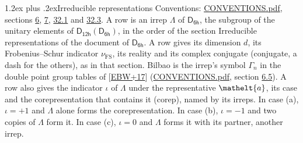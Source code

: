 \documentclass[10pt,a4paper]{article}
\makeatletter
\renewcommand\section{\@startsection{section}{1}{\z@}{-3ex plus -1ex minus -.2ex}%
  {1.2ex plus .2ex}{\normalfont\large\sffamily\bfseries\color{parttitle}}}
\numberwithin{equation}{section}
\newcommand{\eltfont}[1]{{\let\sigma\eltsigma\mathelt{#1}}}
\newcommand{\grp}[1]{\mathsf{#1}}
\newcommand{\elt}[1]{\eltfont{#1}}
\newcommand{\fsind}{\nu_{\mathrm{FS}}}
\makeatother
\begin{document}
\section{Irreducible representations}\label{s:irreps}
Conventions: \href{../../CONVENTIONS.pdf}{CONVENTIONS.pdf}, sections \href{../../../rotation/CONVENTIONS.pdf\#conv.6}{6}, \href{../../../rotation/CONVENTIONS.pdf\#conv.7}{7}, \href{../../CONVENTIONS.pdf\#conv.32.1}{32.1} and \href{../../CONVENTIONS.pdf\#conv.32.3}{32.3}.
\leavevmode\label{n:irrep.Delta}A row is an irrep $\Lambda$ of $\grp{D_{6h}}$, the subgroup of the unitary elements of $\grp{D_{12h}}(\grp{D_{6h}})$, in the order of the section Irreducible representations of the document of \href{../../../rotation/data/pdf/D6h.pdf}{$\grp{D_{6h}}$}. \label{n:index.dimension}\label{n:index.frobenius}\label{n:head.irrep}\label{n:head.reality}\label{n:head.conjugate}A row gives its dimension $d$, its Frobenius--Schur indicator $\fsind$, its reality and its complex conjugate (conjugate, a dash for the others), as in that section. \label{n:head.bilbao}\label{n:irrep.alias.gamma}Bilbao is the irrep's symbol $\Gamma_n$ in the double point group tables of [\href{../../../REFERENCES.pdf\#ref.EBW+17}{EBW+17}] (\href{../../CONVENTIONS.pdf}{CONVENTIONS.pdf}, section \href{../../../rotation/CONVENTIONS.pdf\#conv.6.5}{6.5}). \label{n:head.case.corep}\label{n:head.corep}A row also gives the indicator $\iota$ of $\Lambda$ under the representative $\elt{a}$, its case and the corepresentation that contains it (corep), named by its irreps. In case (a), $\iota = +1$ and $\Lambda$ alone forms the corepresentation. In case (b), $\iota = -1$ and two copies of $\Lambda$ form it. In case (c), $\iota = 0$ and $\Lambda$ forms it with its partner, another irrep.
\setlength{\emergencystretch}{2em}\par\setlength{\emergencystretch}{0pt}
\end{document}
